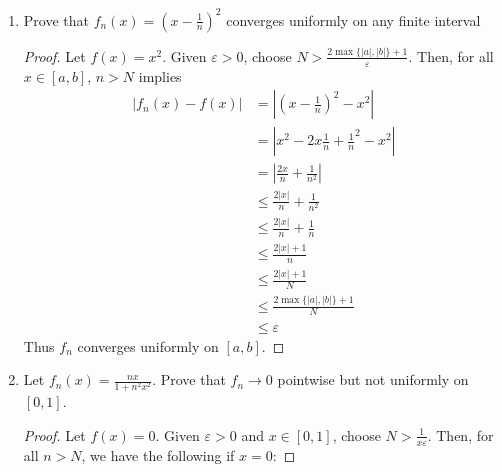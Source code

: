 \documentclass{article}
\begin{document}
\begin{enumerate}
\begin{enumerate}
\begin{proof}
                        \end{proof}
            \end{enumerate}
            \setcounter{enumi}{4}
      \item Prove that $f_n(x)=(x-\frac{1}{n})^2$ converges uniformly
            on any finite interval
            \begin{proof}
                  Let $f(x)=x^2$. Given $\varepsilon>0$, choose $N>\frac{2\max\{\lvert a\rvert, \lvert b\rvert\}+1}{\varepsilon}$. Then, for
                  all $x\in [a,b]$, $n>N$ implies
                  \begin{align*}
                        \lvert f_n(x)-f(x)\rvert & = \left\lvert \left(x-\frac{1}{n}\right)^2-x^2\right\rvert    \\
                                                 & = \left\lvert x^2-2x\frac{1}{n}+\frac{1}{n}^2-x^2\right\rvert \\
                                                 & = \left\lvert \frac{2x}{n}+\frac{1}{n^2}\right\rvert          \\
                                                 & \leq \frac{2\lvert x\rvert}{n}+\frac{1}{n^2}                  \\
                                                 & \leq \frac{2\lvert x\rvert}{n}+\frac{1}{n}                    \\
                                                 & \leq \frac{2\lvert x\rvert+1}{n}                              \\
                                                 & \leq \frac{2\lvert x\rvert+1}{N}                              \\
                                                 & \leq \frac{2\max\{\lvert a\rvert, \lvert b\rvert\}+1}{N}      \\
                                                 & \leq \varepsilon
                  \end{align*}
                  Thus $f_n$ converges uniformly on $[a,b]$.
            \end{proof}
            \setcounter{enumi}{6}
      \item Let $f_n(x) = \frac{nx}{1+n^2x^2}$. Prove that $f_n\to 0$
            pointwise but not uniformly on $[0,1]$.
            \begin{proof}
                  Let $f(x)=0$. Given $\varepsilon>0$ and $x\in[0,1]$,
                  choose $N>\frac{1}{x\varepsilon}$.
                  Then, for all $n>N$, we have the following if $x=0$:

\end{proof}
\end{enumerate}
\end{document}
